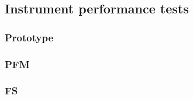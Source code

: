 	\subsection{Instrument performance tests}
		\subsubsection{Prototype} %
		\subsubsection{PFM} %
		\subsubsection{FS} %
		
